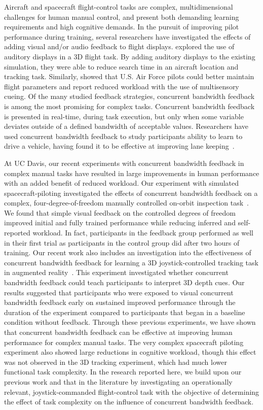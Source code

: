 Aircraft and spacecraft flight-control tasks are complex, multidimensional challenges for human manual control, and present both demanding learning requirements and high cognitive demands.
In the pursuit of improving pilot performance during training, several researchers have investigated the effects of adding visual and/or audio feedback to flight displays.
\citeauthor{doi:10.1518/001872096778940859} explored the use of auditory displays in a 3D flight task.
By adding auditory displays to the existing simulation, they were able to reduce search time in an aircraft location and tracking task.
Similarly, \citeauthor{doi:10.1207/s15327108ijap1403} showed that U.S. Air Force pilots could better maintain flight parameters and report reduced workload with the use of multisensory cueing.
Of the many studied feedback strategies, concurrent bandwidth feedback is among the most promising for complex tasks.
Concurrent bandwidth feedback is presented in real-time, during task execution, but only when some variable deviates outside of a defined bandwidth of acceptable values.
Researchers have used concurrent bandwidth feedback to study participants ability to learn to drive a vehicle, having found it to be effective at improving lane keeping~\citep{de_groot_effect_2011}.

At UC Davis, our recent experiments with concurrent bandwidth feedback in complex manual tasks have resulted in large improvements in human performance with an added benefit of reduced workload.
Our experiment with simulated spacecraft-piloting investigated the effects of concurrent bandwidth feedback on a complex, four-degree-of-freedom manually controlled on-orbit inspection task~\citep{karasinski_real-time_2017}.
We found that simple visual feedback on the controlled degrees of freedom improved initial and fully trained performance while reducing inferred and self-reported workload.
In fact, participants in the feedback group performed as well in their first trial as participants in the control group did after two hours of training.
Our recent work also includes an investigation into the effectiveness of concurrent bandwidth feedback for learning a 3D joystick-controlled tracking task in augmented reality~\citep{karasinski_evaluating_2019}.
This experiment investigated whether concurrent bandwidth feedback could teach participants to interpret 3D depth cues.
Our results suggested that participants who were exposed to visual concurrent bandwidth feedback early on sustained improved performance through the duration of the experiment compared to participants that began in a baseline condition without feedback.
Through these previous experiments, we have shown that concurrent bandwidth feedback can be effective at improving human performance for complex manual tasks.
The very complex spacecraft piloting experiment also showed large reductions in cognitive workload, though this effect was not observed in the 3D tracking experiment, which had much lower functional task complexity.
In the research reported here, we build upon our previous work and that in the literature by investigating an operationally relevant, joystick-commanded flight-control task with the objective of determining the effect of task complexity on the influence of concurrent bandwidth feedback.

